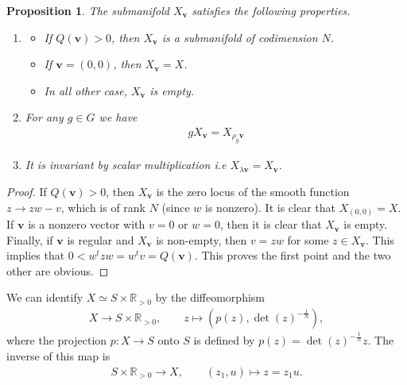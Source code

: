 \documentclass[a4paper,11pt]{amsart} %
\newcommand{\8}{\infty}
\newcommand{\vbf}{\mathbf{v}}
\newcommand{\GL}{\mathrm{GL}}
\newcommand{\R}{\mathbb{R}}
\theoremstyle{mytheoremstyle}
\newtheorem{prop}[thm]{Proposition}
\theoremstyle{remark}
\numberwithin{equation}{section}
\begin{document}
\begin{prop} \label{properties of Xv} The submanifold $X_{\vbf}$ satisfies the following properties.
\begin{enumerate} 
\item \begin{itemize} \item[$-$] If $Q(\vbf)>0$, then $X_{\vbf}$ is a submanifold of codimension $N$.
\item[$-$] If $\vbf=(0,0)$, then $X_\vbf=X$.
\item[$-$] In all other case, $X_{\vbf}$ is empty.
\end{itemize} 
\item For any $g \in G$ we have 
\begin{align}
    gX_{\vbf}=X_{\rho_g\vbf}
\end{align}
\item It is invariant by scalar multiplication {\em i.e} $X_{\lambda \vbf}=X_{\vbf}$.
\end{enumerate}
\end{prop}
\begin{proof} If $Q(\vbf)>0$, then $X_\vbf$ is the zero locus of the smooth function $z \longrightarrow zw-v$, which is of rank $N$ (since $w$ is nonzero). It is clear that $X_{(0,0)}=X$.  If $\vbf$ is a nonzero vector with $v=0$ or $w=0$, then it is clear that $X_\vbf$ is empty. Finally, if $\vbf$ is regular and $X_{\vbf}$ is non-empty, then $v=zw$ for some $z \in X_\vbf$. This implies that $0<w^tzw=w^tv=Q(\vbf)$. This proves the first point and the two other are obvious.
\end{proof}
We can identify $X \simeq S \times \R_{>0}$ by the diffeomorphism
\begin{align} \label{bundleiso}
    X  \longrightarrow S \times \R_{>0}, \qquad z \longmapsto \left (p(z), \det(z)^{-\frac{1}{N}} \right ),
\end{align}
where the projection $p \colon X \longrightarrow S$ onto $S$ is defined by $p(z)=\det(z)^{-\frac{1}{N}}z$. The inverse of this map is 
\begin{align}
    S \times \R_{>0} \longrightarrow X, \qquad (z_1,u) \longmapsto z=z_1u.
\end{align}
\end{document}
